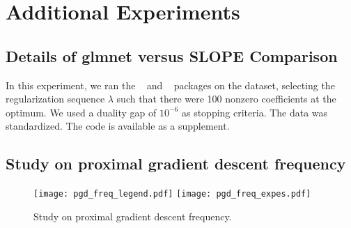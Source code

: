 \section{Additional Experiments}\label{sec:add_expes}

\subsection{Details of \textsf{glmnet} versus \textsf{SLOPE} Comparison}
\label{sec:slope-vs-glmnet}

In this experiment, we ran the ~\parencite{friedman2022} and ~\parencite{larsson2022d} packages on the  dataset, selecting the regularization sequence \(\lambda\) such that there were 100 nonzero coefficients at the optimum.
We used a duality gap of \(10^{-6}\) as stopping criteria.
The data was standardized.
The code is available as a supplement.

\subsection{Study on proximal gradient descent frequency}

\begin{figure*}[htb]
  \centering
  \texttt{[image: pgd\_freq\_legend.pdf]}
  \texttt{[image: pgd\_freq\_expes.pdf]}
  \caption{Study on proximal gradient descent frequency.}
  \label{fig:pgd_freq}
\end{figure*}
